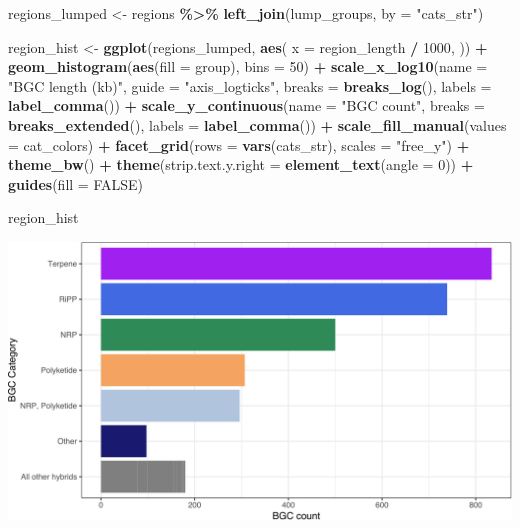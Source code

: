 \documentclass[
]{article}
\newenvironment{Shaded}{\begin{snugshade}}{\end{snugshade}}
\newcommand{\AttributeTok}[1]{\textcolor[rgb]{0.13,0.29,0.53}{#1}}
\newcommand{\ConstantTok}[1]{\textcolor[rgb]{0.56,0.35,0.01}{#1}}
\newcommand{\DecValTok}[1]{\textcolor[rgb]{0.00,0.00,0.81}{#1}}
\newcommand{\FunctionTok}[1]{\textcolor[rgb]{0.13,0.29,0.53}{\textbf{#1}}}
\newcommand{\NormalTok}[1]{#1}
\newcommand{\OtherTok}[1]{\textcolor[rgb]{0.56,0.35,0.01}{#1}}
\newcommand{\SpecialCharTok}[1]{\textcolor[rgb]{0.81,0.36,0.00}{\textbf{#1}}}
\newcommand{\StringTok}[1]{\textcolor[rgb]{0.31,0.60,0.02}{#1}}
\begin{document}
\begin{Shaded}
\begin{Highlighting}[]
\NormalTok{regions\_lumped }\OtherTok{\textless{}{-}}\NormalTok{ regions }\SpecialCharTok{\%\textgreater{}\%} \FunctionTok{left\_join}\NormalTok{(lump\_groups, }\AttributeTok{by =} \StringTok{"cats\_str"}\NormalTok{)}

\NormalTok{region\_hist }\OtherTok{\textless{}{-}} \FunctionTok{ggplot}\NormalTok{(regions\_lumped, }\FunctionTok{aes}\NormalTok{(}
  \AttributeTok{x =}\NormalTok{ region\_length }\SpecialCharTok{/} \DecValTok{1000}\NormalTok{,}
\NormalTok{)) }\SpecialCharTok{+}
  \FunctionTok{geom\_histogram}\NormalTok{(}\FunctionTok{aes}\NormalTok{(}\AttributeTok{fill =}\NormalTok{ group), }\AttributeTok{bins =} \DecValTok{50}\NormalTok{) }\SpecialCharTok{+}
  \FunctionTok{scale\_x\_log10}\NormalTok{(}\AttributeTok{name =} \StringTok{"BGC length (kb)"}\NormalTok{, }\AttributeTok{guide =} \StringTok{"axis\_logticks"}\NormalTok{, }\AttributeTok{breaks =} \FunctionTok{breaks\_log}\NormalTok{(), }\AttributeTok{labels =} \FunctionTok{label\_comma}\NormalTok{()) }\SpecialCharTok{+}
  \FunctionTok{scale\_y\_continuous}\NormalTok{(}\AttributeTok{name =} \StringTok{"BGC count"}\NormalTok{, }\AttributeTok{breaks =} \FunctionTok{breaks\_extended}\NormalTok{(), }\AttributeTok{labels =} \FunctionTok{label\_comma}\NormalTok{()) }\SpecialCharTok{+}
  \FunctionTok{scale\_fill\_manual}\NormalTok{(}\AttributeTok{values =}\NormalTok{ cat\_colors) }\SpecialCharTok{+}
  \FunctionTok{facet\_grid}\NormalTok{(}\AttributeTok{rows =} \FunctionTok{vars}\NormalTok{(cats\_str), }\AttributeTok{scales =} \StringTok{"free\_y"}\NormalTok{) }\SpecialCharTok{+}
  \FunctionTok{theme\_bw}\NormalTok{() }\SpecialCharTok{+}
  \FunctionTok{theme}\NormalTok{(}\AttributeTok{strip.text.y.right =} \FunctionTok{element\_text}\NormalTok{(}\AttributeTok{angle =} \DecValTok{0}\NormalTok{)) }\SpecialCharTok{+}
  \FunctionTok{guides}\NormalTok{(}\AttributeTok{fill =} \ConstantTok{FALSE}\NormalTok{)}

\NormalTok{region\_hist}
\end{Highlighting}
\end{Shaded}

\includegraphics{analysis_files/figure-latex/unnamed-chunk-9-1.pdf}
\end{document}
